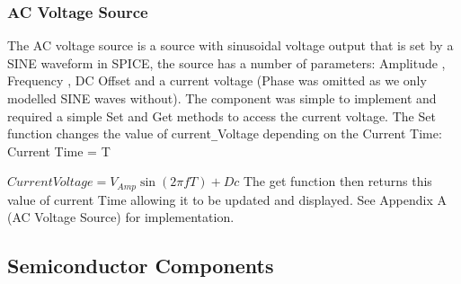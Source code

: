 \documentclass{article}
\begin{document}
\subsubsection{AC Voltage Source}
The AC voltage source is a source with sinusoidal voltage output that is set by a SINE waveform in SPICE, the source has a number of parameters: Amplitude , Frequency , DC Offset and a current voltage (Phase was omitted as we only modelled SINE waves without). The component was simple to implement and required a simple Set and Get methods to access the current voltage. 
The Set function changes the value of current\verb|_|Voltage depending on the Current Time: Current Time = T
\medbreak

$ CurrentVoltage = V_{Amp}  \sin{(2\pi f T)} + Dc $
\medbreak
The get function then returns this value of current Time allowing it to be updated and displayed.
\bigbreak
See Appendix A (AC Voltage Source) for implementation.
\newpage

\subsection{Semiconductor Components}
\end{document}

